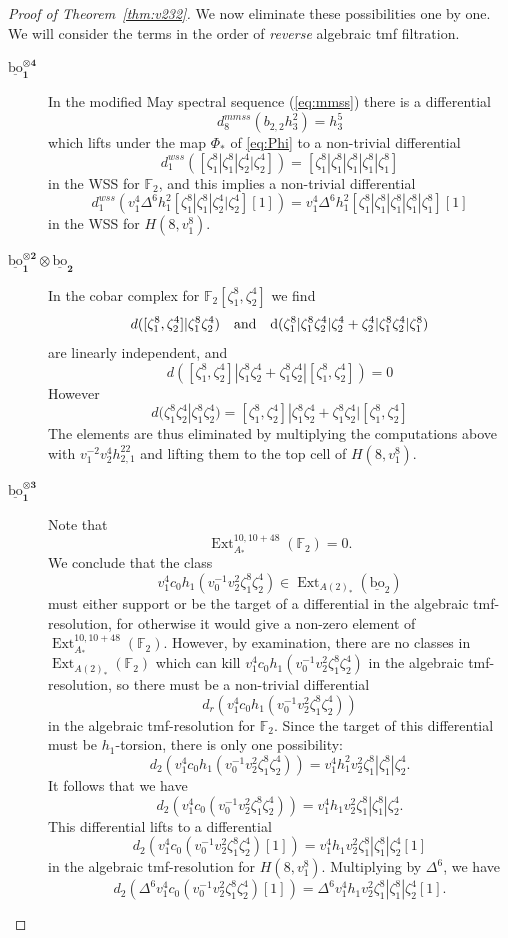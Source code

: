 \documentclass[10pt]{amsart}
\newcommand{\ul}[1]{\underline{#1}}
\newcommand{\FF}{\mathbb{F}}
\newcommand{\bo}{\mathrm{bo}}
\newcommand{\bou}{\ul{\bo}}
\theoremstyle{definition}
\numberwithin{equation}{section}
\numberwithin{figure}{section}
\DeclareMathOperator{\Ext}{Ext}
\begin{document}
\begin{proof}[Proof of Theorem~\ref{thm:v232}]
We now eliminate these possibilities one by one.  We will consider the terms in the order of \emph{reverse} algebraic tmf filtration.
\begin{description}
\item[$\pmb{\bou_1^{\otimes 4}}$] In the modified May spectral sequence (\ref{eq:mmss}) there is a differential
$$ d^{mmss}_8(b_{2,2}h^2_3) = h_3^5 $$
which lifts under the map $\Phi_*$ of \ref{eq:Phi} to a non-trivial differential
$$ d_1^{wss}([\zeta^8_1|\zeta^8_1|\zeta_2^4|\zeta_2^4]) = [\zeta_1^8|\zeta_1^8|\zeta_1^8|\zeta_1^8|\zeta_1^8] $$ 
in the WSS for $\FF_2$, 
and this implies a non-trivial differential
$$ d_1^{wss}(v_1^4 \Delta^6 h_1^2[\zeta^8_1|\zeta^8_1|\zeta_2^4|\zeta_2^4][1])
= v_1^4 \Delta^6 h_1^2 [\zeta_1^8|\zeta_1^8|\zeta_1^8|\zeta_1^8|\zeta_1^8][1] $$
in the WSS for $H(8,v_1^8)$.
\vspace{10pt}

\item[$\pmb{\bou_1^{\otimes 2} \otimes \bou_2}$]  In the cobar complex for $\FF_2[\zeta_1^8, \zeta_2^4]$ we find
$$
 d([\zeta_1^8,\zeta_2^4]|\zeta_1^8\zeta_2^4) \quad \rm{and} \quad d(\zeta_1^8|\zeta_1^8\zeta_2^4|\zeta_2^4 + \zeta_2^4|\zeta_1^8\zeta_2^4|\zeta_1^8)
$$
are linearly independent, and
$$ d([\zeta_1^8,\zeta^4_2]|\zeta_1^8\zeta_2^4+\zeta_1^8\zeta_2^4|[\zeta_1^8,\zeta_2^4]) = 0 $$
However
$$ d(\zeta_1^8\zeta_2^4|\zeta_1^8\zeta_2^4) = [\zeta_1^8,\zeta^4_2]|\zeta_1^8\zeta_2^4+\zeta_1^8\zeta_2^4|[\zeta_1^8,\zeta_2^4] $$
The elements are thus eliminated by multiplying the computations above with $v_1^{-2}v_2^4h^{22}_{2,1}$ and lifting them to the top cell of $H(8,v_1^8)$.
\vspace{10pt}

\item[$\pmb{\bou_1^{\otimes 3}}$]
Note that
$$ \Ext^{10,10+48}_{A_*}(\FF_2) = 0. $$
We conclude that the class
$$ v_1^4c_0h_1(v_0^{-1}v_2^2\zeta_1^8\zeta_2^4) \in \Ext_{A(2)_*}(\bou_2) $$
must either support or be the target of a differential in the algebraic tmf-resolution, for otherwise it would give a non-zero element of $\Ext^{10,10+48}_{A_*}(\FF_2)$.  However, by examination, there are no classes in $\Ext_{A(2)_*}(\FF_2)$ which can kill $v_1^4c_0h_1(v_0^{-1}v_2^2\zeta_1^8\zeta_2^4)$ in the algebraic tmf-resolution, so there must be a non-trivial differential
$$ d_r(v_1^4c_0h_1(v_0^{-1}v_2^2\zeta_1^8\zeta_2^4)) $$
in the algebraic tmf-resolution for $\FF_2$.  Since the target of this differential must be $h_1$-torsion, there is only one possibility:
$$ d_2(v_1^4c_0h_1(v_0^{-1}v_2^2\zeta_1^8\zeta_2^4)) = v_1^4 h_1^2 v_2^2 \zeta_1^8|\zeta_1^8|\zeta_2^4. $$
It follows that we have
$$ d_2(v_1^4c_0(v_0^{-1}v_2^2\zeta_1^8\zeta_2^4)) = v_1^4 h_1 v_2^2 \zeta_1^8|\zeta_1^8|\zeta_2^4. $$
This differential lifts to a differential
$$ d_2(v_1^4c_0(v_0^{-1}v_2^2\zeta_1^8\zeta_2^4)[1]) = v_1^4 h_1 v_2^2 \zeta_1^8|\zeta_1^8|\zeta_2^4[1] $$
in the algebraic tmf-resolution for $H(8,v_1^8)$.  Multiplying by $\Delta^6$, we have
$$ d_2(\Delta^6 v_1^4c_0(v_0^{-1}v_2^2\zeta_1^8\zeta_2^4)[1]) = \Delta^6 v_1^4 h_1 v_2^2 \zeta_1^8|\zeta_1^8|\zeta_2^4[1]. $$


\end{description}
\end{proof}
\end{document}
